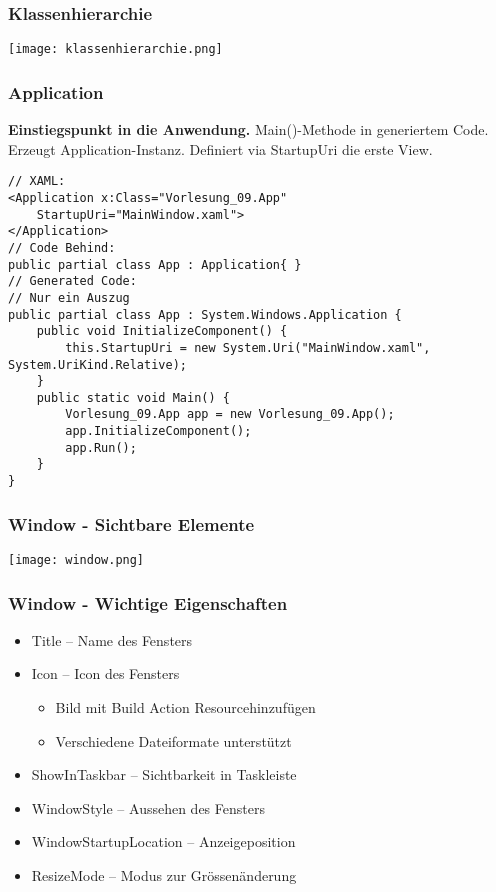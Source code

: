 \subsubsection{Klassenhierarchie}
\texttt{[image: klassenhierarchie.png]}
\subsubsection{Application}
\textbf{Einstiegspunkt in die Anwendung.} Main()-Methode in generiertem Code. Erzeugt Application-Instanz. Definiert via StartupUri die erste View.
\begin{lstlisting}
// XAML:
<Application x:Class="Vorlesung_09.App"
    StartupUri="MainWindow.xaml">
</Application>
// Code Behind:
public partial class App : Application{ }
// Generated Code:
// Nur ein Auszug
public partial class App : System.Windows.Application {
    public void InitializeComponent() {
        this.StartupUri = new System.Uri("MainWindow.xaml", System.UriKind.Relative);
    }
    public static void Main() {
        Vorlesung_09.App app = new Vorlesung_09.App();
        app.InitializeComponent();
        app.Run();
    }
}
\end{lstlisting}
\subsubsection{Window - Sichtbare Elemente}
\begin{center}
    \texttt{[image: window.png]}
\end{center}
\subsubsection{Window - Wichtige Eigenschaften}
\begin{itemize}[topsep=0pt, leftmargin=4mm]
    \setlength\itemsep{-0.3em}
    \item Title – Name des Fensters
    \item Icon – Icon des Fensters
    \begin{itemize}[topsep=0pt, leftmargin=4mm]
        \setlength\itemsep{-0.3em}
        \item Bild mit Build Action \dq Resource\dq hinzufügen
        \item Verschiedene Dateiformate unterstützt
    \end{itemize}
    \item ShowInTaskbar – Sichtbarkeit in Taskleiste
    \item WindowStyle – Aussehen des Fensters
    \item WindowStartupLocation – Anzeigeposition
    \item ResizeMode – Modus zur Grössenänderung
\end{itemize}
